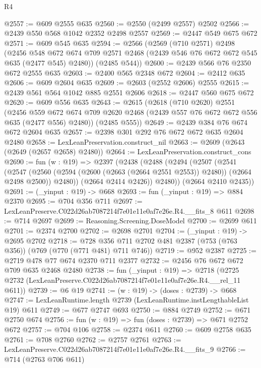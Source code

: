 \begin{lexlean}{R4}
\begin{coremodule}
@2557 := @609 @2555 @635
@2560 := @2550 (@2499 @2557) @2502
@2566 := @2439 @550 @568 @1042 @2352 @2498 @2557
@2569 := @2447 @549 @675 @672
@2571 := @609 @545 @635
@2594 := @2566
    (@2569
      (@710 @2571)
      @2498
      (@2456
        @548
        @672
        @674
        @709
        @2571
        @2468
        (@2439 @546 @76 @672 @672 @545 @635 (@2477 @545) @2480))
      (@2485 @544))
@2600 := @2439 @566 @76 @2350 @672 @2555 @635
@2603 := @2400 @565 @2348 @672
@2604 := @2412 @635
@2606 := @609 @2604 @635
@2609 := @2603 (@2552 @2606) @2555
@2615 := @2439 @561 @564 @1042 @885 @2551 @2606
@2618 := @2447 @560 @675 @672
@2620 := @609 @556 @635
@2643 := @2615
    (@2618
      (@710 @2620)
      @2551
      (@2456
        @559
        @672
        @674
        @709
        @2620
        @2468
        (@2439 @557 @76 @672 @672 @556 @635 (@2477 @556) @2480))
      (@2485 @555))
@2649 := @2439 @384 @76 @674 @672 @2604 @635
@2657 := @2398 @301 @292 @76 @672 @672 @635 @2604 @2480
@2658 := LexLeanPreservation.construct_nil
@2663 := @2609 (@2643 (@2649 (@2657 @2658) @2480))
@2664 := LexLeanPreservation.construct_cons
@2690 := fun (w : @19) =>
  @2397
    (@2438
      (@2488
        (@2494
          (@2507
            (@2541
              (@2547
                (@2560 (@2594 (@2600 (@2663 (@2664 @2551 @2553)) @2480)) (@2664 @2498 @2500))
                @2480))
            (@2664 @2414 @2426))
          @2480))
      (@2664 @2410 @2435))
@2691 := (_yinput : @19) -> @668
@2693 := fun (_yinput : @19) => @884 @2370
@2695 := @704 @356 @711
@2697 := LexLeanPreserve.C022d26ab7087214f7e01e11e0af7e26e.R4.__fits_8 @611
@2698 := @714 @2697
@2699 := Reasoning.Screening.DoseModel
@2700 := @2699 @611
@2701 := @2374 @2700
@2702 := @2698 @2701
@2704 := (_yinput : @19) -> @2695 @2702
@2718 := @728 @356 @711 @2702 @481 @2387 (@753 (@763 @356)) (@769 (@770 (@771 @481) @711 @746))
@2719 := @952 @2387
@2725 := @2719 @478 @77 @674 @2370 @711 @2377
@2732 := @2456 @76 @672 @672 @709 @635 @2468 @2480
@2738 := fun (_yinput : @19) =>
  @2718 (@2725 @2732 (LexLeanPreserve.C022d26ab7087214f7e01e11e0af7e26e.R4.__rel_11 @611))
@2739 := @6 @19
@2741 := (w : @19) -> (doses : @2739) -> @668
@2747 := LexLeanRuntime.length @2739 (LexLeanRuntime.instLengthableList @19) @611
@2749 := @677 @2747 @693
@2750 := @884 @2749
@2752 := @671 @2750 @674
@2756 := fun (w : @19) => fun (doses : @2739) => @671 @2752 @672
@2757 := @704 @106
@2758 := @2374 @611
@2760 := @609 @2758 @635
@2761 := @708 @2760
@2762 := @2757 @2761
@2763 := LexLeanPreserve.C022d26ab7087214f7e01e11e0af7e26e.R4.__fits_9
@2766 := @714 (@2763 @706 @611)

\end{coremodule}
\end{lexlean}
